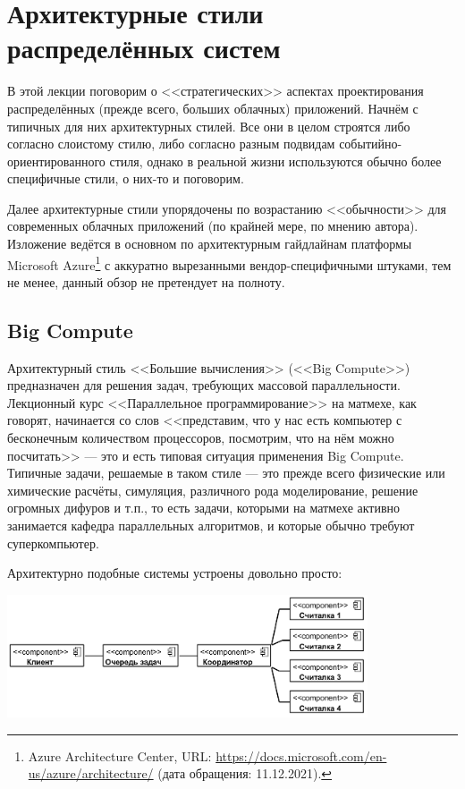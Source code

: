 \documentclass{../../text-style}
\begin{document}
\maketitle
\thispagestyle{empty}

\section{Архитектурные стили распределённых систем}

В этой лекции поговорим о <<стратегических>> аспектах проектирования распределённых (прежде всего, больших облачных) приложений. Начнём с типичных для них архитектурных стилей. Все они в целом строятся либо согласно слоистому стилю, либо согласно разным подвидам событийно-ориентированного стиля, однако в реальной жизни используются обычно более специфичные стили, о них-то и поговорим.

Далее архитектурные стили упорядочены по возрастанию <<обычности>> для современных облачных приложений (по крайней мере, по мнению автора). Изложение ведётся в основном по архитектурным гайдлайнам платформы Microsoft Azure\footnote{Azure Architecture Center, URL: \url{https://docs.microsoft.com/en-us/azure/architecture/} (дата обращения: 11.12.2021).} с аккуратно вырезанными вендор-специфичными штуками, тем не менее, данный обзор не претендует на полноту.

\subsection{Big Compute}

Архитектурный стиль <<Большие вычисления>> (<<Big Compute>>) предназначен для решения задач, требующих массовой параллельности. Лекционный курс <<Параллельное программирование>> на матмехе, как говорят, начинается со слов <<представим, что у нас есть компьютер с бесконечным количеством процессоров, посмотрим, что на нём можно посчитать>> --- это и есть типовая ситуация применения Big Compute. Типичные задачи, решаемые в таком стиле --- это прежде всего физические или химические расчёты, симуляция, различного рода моделирование, решение огромных дифуров и т.п., то есть задачи, которыми на матмехе активно занимается кафедра параллельных алгоритмов, и которые обычно требуют суперкомпьютер. 

Архитектурно подобные системы устроены довольно просто:

\begin{center}
    \includegraphics[width=0.8\textwidth]{bigCompute.png}
\end{center}
\end{document}
